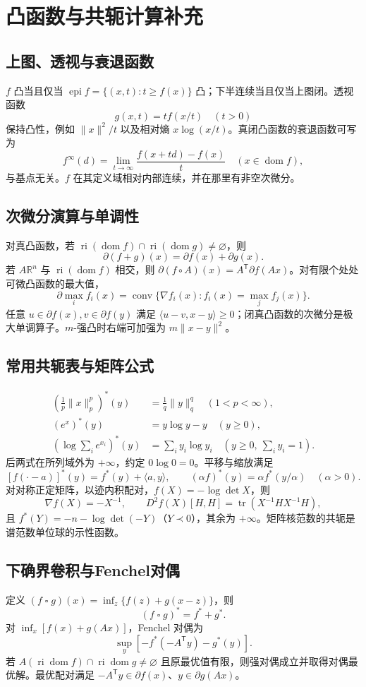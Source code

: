 \documentclass[../main.tex]{subfiles}
\begin{document}
\section{凸函数与共轭计算补充}
\subsection{上图、透视与衰退函数}
$f$ 凸当且仅当 $\operatorname{epi}f=\{(x,t):t\ge f(x)\}$ 凸；下半连续当且仅当上图闭。透视函数
\[
g(x,t)=t f(x/t)\quad(t>0)
\]
保持凸性，例如 $\|x\|^2/t$ 以及相对熵 $x\log(x/t)$。真闭凸函数的衰退函数可写为
\[
f^\infty(d)=\lim_{t\to\infty}\frac{f(x+td)-f(x)}t\quad(x\in\operatorname{dom}f),
\]
与基点无关。$f$ 在其定义域相对内部连续，并在那里有非空次微分。
\subsection{次微分演算与单调性}
对真凸函数，若 $\operatorname{ri}(\operatorname{dom}f)\cap\operatorname{ri}(\operatorname{dom}g)\ne\varnothing$，则
\[
\partial(f+g)(x)=\partial f(x)+\partial g(x).
\]
若 $A\mathbb R^n$ 与 $\operatorname{ri}(\operatorname{dom}f)$ 相交，则 $\partial(f\circ A)(x)=A^{\mathsf T}\partial f(Ax)$。对有限个处处可微凸函数的最大值，
\[
\partial\max_i f_i(x)=\operatorname{conv}\{\nabla f_i(x):f_i(x)=\max_jf_j(x)\}.
\]
任意 $u\in\partial f(x),v\in\partial f(y)$ 满足 $\langle u-v,x-y\rangle\ge0$；闭真凸函数的次微分是极大单调算子。$m$-强凸时右端可加强为 $m\|x-y\|^2$。
\subsection{常用共轭表与矩阵公式}
\begin{align*}
\left(\frac1p\|x\|_p^p\right)^*(y)&=\frac1q\|y\|_q^q\quad(1<p<\infty),\\
(e^x)^*(y)&=y\log y-y\quad(y\ge0),\\
\left(\log\sum_ie^{x_i}\right)^*(y)&=\sum_i y_i\log y_i\quad(y\ge0,\ \sum_i y_i=1).
\end{align*}
后两式在所列域外为 $+\infty$，约定 $0\log0=0$。平移与缩放满足
\[
[f(\cdot-a)]^*(y)=f^*(y)+\langle a,y\rangle,\qquad
(\alpha f)^*(y)=\alpha f^*(y/\alpha)\quad(\alpha>0).
\]
对对称正定矩阵，以迹内积配对，$f(X)=-\log\det X$，则
\[
\nabla f(X)=-X^{-1},\qquad D^2f(X)[H,H]=\operatorname{tr}(X^{-1}HX^{-1}H),
\]
且 $f^*(Y)=-n-\log\det(-Y)$（$Y\prec0$），其余为 $+\infty$。矩阵核范数的共轭是谱范数单位球的示性函数。
\subsection{下确界卷积与Fenchel对偶}
定义 $(f\mathbin\square g)(x)=\inf_z\{f(z)+g(x-z)\}$，则
\[
(f\mathbin\square g)^*=f^*+g^*.
\]
对 $\inf_x[f(x)+g(Ax)]$，Fenchel 对偶为
\[
\sup_y[-f^*(-A^{\mathsf T}y)-g^*(y)].
\]
若 $A(\operatorname{ri}\operatorname{dom}f)\cap\operatorname{ri}\operatorname{dom}g\ne\varnothing$ 且原最优值有限，则强对偶成立并取得对偶最优解。最优配对满足 $-A^{\mathsf T}y\in\partial f(x)$、$y\in\partial g(Ax)$。
\end{document}

